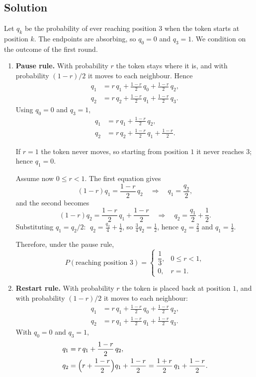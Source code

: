 \documentclass[11pt,a4paper]{article}
\newcommand{\Prob}{P}
\begin{document}
\subsection*{Solution}

Let $q_k$ be the probability of ever reaching position $3$ when the token
starts at position $k$. The endpoints are absorbing, so $q_0=0$ and $q_3=1$.
We condition on the outcome of the first round.

\begin{enumerate}
\item \textbf{Pause rule.} With probability $r$ the token stays where it is,
and with probability $(1-r)/2$ it moves to each neighbour. Hence
\begin{align*}
q_1 &= r\,q_1 + \frac{1-r}{2}\,q_0 + \frac{1-r}{2}\,q_2,\\
q_2 &= r\,q_2 + \frac{1-r}{2}\,q_1 + \frac{1-r}{2}\,q_3 .
\end{align*}
Using $q_0=0$ and $q_3=1$,
\begin{align*}
q_1 &= r\,q_1 + \frac{1-r}{2}\,q_2,\\
q_2 &= r\,q_2 + \frac{1-r}{2}\,q_1 + \frac{1-r}{2}.
\end{align*}

If $r=1$ the token never moves, so starting from position $1$ it never
reaches $3$; hence $q_1=0$.

Assume now $0\le r<1$. The first equation gives
\[
(1-r)q_1=\frac{1-r}{2}\,q_2 \quad\Longrightarrow\quad q_1=\frac{q_2}{2},
\]
and the second becomes
\[
(1-r)q_2=\frac{1-r}{2}\,q_1+\frac{1-r}{2}
\quad\Longrightarrow\quad q_2=\frac{q_1}{2}+\frac12 .
\]
Substituting $q_1=q_2/2$: $\;q_2=\tfrac{q_2}{4}+\tfrac12$, so
$\tfrac34 q_2=\tfrac12$, hence $q_2=\tfrac23$ and $q_1=\tfrac13$.

Therefore, under the pause rule,
\[
\Prob(\text{reaching position }3)=
\begin{cases}
\dfrac13, & 0\le r<1,\\[2mm]
0, & r=1.
\end{cases}
\]

\item \textbf{Restart rule.} With probability $r$ the token is placed back at
position $1$, and with probability $(1-r)/2$ it moves to each neighbour:
\begin{align*}
q_1 &= r\,q_1 + \frac{1-r}{2}\,q_0 + \frac{1-r}{2}\,q_2,\\
q_2 &= r\,q_1 + \frac{1-r}{2}\,q_1 + \frac{1-r}{2}\,q_3 .
\end{align*}
With $q_0=0$ and $q_3=1$,
\begin{align*}
q_1 &= r\,q_1 + \frac{1-r}{2}\,q_2,\\
q_2 &= \Bigl(r+\frac{1-r}{2}\Bigr)q_1 + \frac{1-r}{2}
     = \frac{1+r}{2}\,q_1 + \frac{1-r}{2}.
\end{align*}


\end{enumerate}
\end{document}
